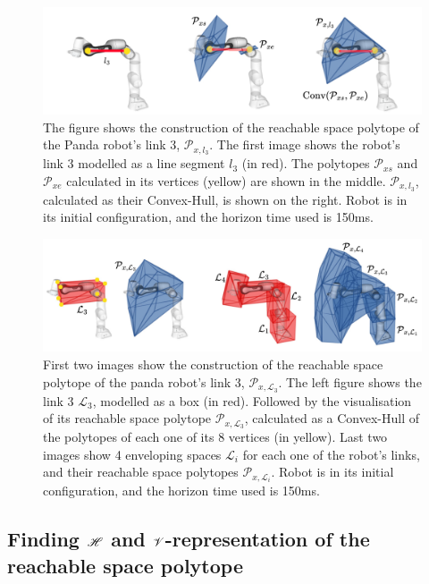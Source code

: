 \begin{figure}[!t]
    \centering
    \includegraphics[width=0.8\linewidth]{Papers/images/minkowski_line_nomath_withmath.png}
    \caption{ The figure shows the construction of the reachable space polytope of the Panda robot's link 3, $\mathcal{P}_{x,l_3}$. The first image shows the robot's link 3 modelled as a line segment $l_3$ (in red). The polytopes $\mathcal{P}_{xs}$ and $\mathcal{P}_{xe}$ calculated in its vertices (yellow) are shown in the middle. $\mathcal{P}_{x,l_3}$, calculated as their Convex-Hull, is shown on the right. Robot is in its initial configuration, and the horizon time used is 150ms.}
    \label{fig:minkowski_line}
\end{figure}

\begin{figure}[!t]
    \centering
    \includegraphics[width=\linewidth]{Papers/images/minkowski_block_nomath_withmath.jpg}
    \caption{ First two images show the construction of the reachable space polytope of the panda robot's link 3, $\mathcal{P}_{x,\mathcal{L}_3}$. The left figure shows the link 3 $\mathcal{L}_3$, modelled as a box (in red). Followed by the visualisation of its reachable space polytope $\mathcal{P}_{x,\mathcal{L}_3}$, calculated as a Convex-Hull of the polytopes of each one of its 8 vertices (in yellow).
    Last two images show 4 enveloping spaces $\mathcal{L}_i$ for each one of the robot's links, and their reachable space polytopes $\mathcal{P}_{x,\mathcal{L}_i}$. Robot is in its initial configuration, and the horizon time used is 150ms.}
    \label{fig:minkowski_block}
\end{figure}


\subsection{Finding $\mathscr{H}$ and $\mathscr{V}$-representation of the reachable space polytope}
\label{ch:enumerating}

